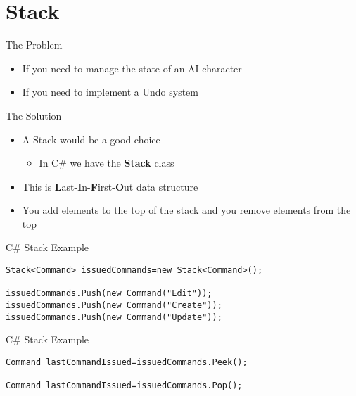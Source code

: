 \part{Stack}
\frame{\partpage}

\begin{frame}{The Problem}
	\begin{itemize}
		\pause \item If you need to manage the state of an AI character
		\pause \item If you need to implement a Undo system   
	\end{itemize}
\end{frame}

\begin{frame}{The Solution}
	\begin{itemize}
	\pause \item A Stack would be a good choice
	\begin{itemize}
		\pause \item In C\# we have the \textbf{Stack} class
	\end{itemize}
	\pause \item This is \textbf{L}ast-\textbf{I}n-\textbf{F}irst-\textbf{O}ut data structure
	\pause \item You add elements to the top of the stack and you remove elements from the top
\end{itemize}
\end{frame}

\begin{frame}[fragile]{C\# Stack
Example}
\begin{lstlisting}
Stack<Command> issuedCommands=new Stack<Command>();

issuedCommands.Push(new Command("Edit"));
issuedCommands.Push(new Command("Create"));
issuedCommands.Push(new Command("Update"));

\end{lstlisting}
\end{frame}

\begin{frame}[fragile]{C\# Stack
	Example}
\begin{lstlisting}
Command lastCommandIssued=issuedCommands.Peek();

Command lastCommandIssued=issuedCommands.Pop();
\end{lstlisting}
\end{frame}
